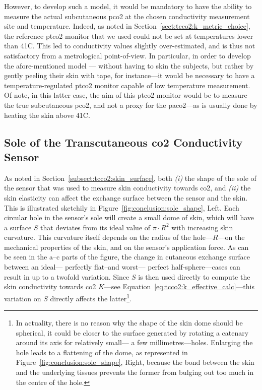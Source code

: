 However, to develop such a model, it would be mandatory to have the ability to measure the actual subcutaneous \gls{pco2} at the chosen conductivity measurement site and temperature. Indeed, as noted in Section~\ref{sect:tcco2:k_metric_choice}, the reference \gls{ptco2} monitor that we used could not be set at temperatures lower than 41{\degree}C. This led to conductivity values slightly over-estimated, and is thus not satisfactory from a metrological point-of-view. In particular, in order to develop the afore-mentioned model \invivo{}---\ie{} without having to skin the subjects, but rather by gently peeling their skin with tape, for instance---it would be necessary to have a temperature-regulated \gls{ptco2} monitor capable of low temperature measurement. Of note, in this latter case, the aim of this \gls{ptco2} monitor would be to measure the true subcutaneous \gls{pco2}, and not a proxy for the \gls{paco2}---as is usually done by heating the skin above 41{\degree}C.

\subsection{Sole of the Transcutaneous \texorpdfstring{\gls{co2}}{CO2} Conductivity Sensor}

As noted in Section~\ref{subsect:tcco2:skin_surface}, both \textit{(i)} the shape of the sole of the sensor that was used to measure skin conductivity towards \gls{co2}, and \textit{(ii)} the skin elasticity can affect the exchange surface between the sensor and the skin. This is illustrated sketchily in Figure~\ref{fig:conclusion:sole_shape}, Left. Each circular hole in the sensor's sole will create a small dome of skin, which will have a surface $S$ that deviates from its ideal value of $\pi\cdot R^2$ with increasing skin curvature. This curvature itself depends on the radius of the hole---$R$---on the mechanical properties of the skin, and on the sensor's application force. As can be seen in the a--c parts of the figure, the change in cutaneous exchange surface between an ideal---\ie{} perfectly flat--and worst---\ie{} perfect half-sphere---cases can result in up to a twofold variation. Since $S$ is then used directly to compute the skin conductivity towards \gls{co2} $K$---see Equation~\ref{eq:tcco2:k_effective_calc}---this variation on $S$ directly affects the latter\footnote{In actuality, there is no reason why the shape of the skin dome should be spherical, it could be closer to the surface generated by rotating a catenary around its axis for relatively small---\ie{} a few millimetres---holes. Enlarging the hole leads to a flattening of the dome, as represented in Figure~\ref{fig:conclusion:sole_shape}, Right, because the bond between the skin and the underlying tissues prevents the former from bulging out too much in the centre of the hole.}.

